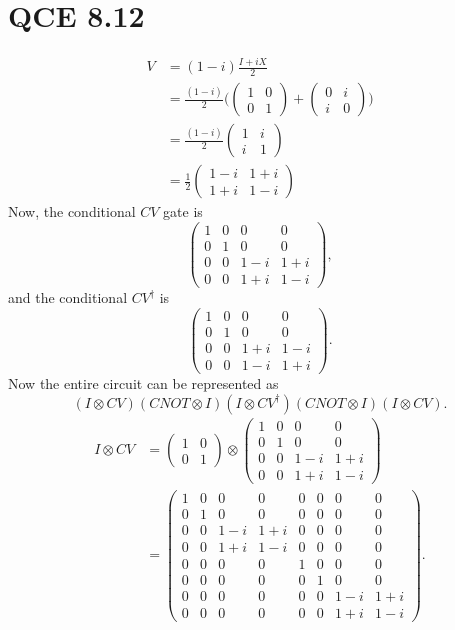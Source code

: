 \documentclass[10pt]{article}
\begin{document}
\section*{QCE 8.12}
\begin{align*}
V &= (1 - i) \frac{I + iX}{2} \\
   &= \frac{(1 - i)}{2} 
\Bigg( 
\begin{pmatrix}
 1 & 0 \\
 0 & 1  
\end{pmatrix}    
+
\begin{pmatrix}
0 & i \\
i & 0
\end{pmatrix}
\Bigg) \\
&= 
\frac{(1-i)}{2} 
\begin{pmatrix}
1 & i \\
i & 1
\end{pmatrix} \\
&= 
\frac{1}{2}
\begin{pmatrix}
1 - i & 1 + i \\
1 + i & 1 - i
\end{pmatrix}
\end{align*}
Now, the conditional $CV$ gate is 
\[
\begin{pmatrix}
1 & 0 & 0 & 0 \\
0 & 1 & 0 & 0 \\
0 & 0 & 1 - i & 1 + i \\
0 & 0 & 1 + i & 1 - i 
\end{pmatrix},
\]
and the conditional $CV^{\dag}$ is
\[
\begin{pmatrix}
1 & 0 & 0 & 0 \\
0 & 1 & 0 & 0 \\
0 & 0 & 1 + i & 1 - i \\
0 & 0 & 1 - i & 1 + i 
\end{pmatrix}.
\]
Now the entire circuit can be represented as
\[
(I \otimes CV)(CNOT \otimes I)(I \otimes CV^{\dag})(CNOT \otimes I)(I \otimes CV).
\]
\begin{align*}
I \otimes CV &= 
\begin{pmatrix}
1 & 0 \\
0 & 1
\end{pmatrix}
\otimes 
\begin{pmatrix}
1 & 0 & 0 & 0 \\
0 & 1 & 0 & 0 \\
0 & 0 & 1 - i & 1 + i \\
0 & 0 & 1 + i & 1 - i 
\end{pmatrix} \\
&= 
\begin{pmatrix}
1 & 0 & 0 & 0 & 0 & 0 & 0 & 0 \\
0 & 1 & 0 & 0 & 0 & 0 & 0 & 0 \\
0 & 0 & 1 - i & 1 + i & 0 & 0 & 0 & 0 \\
0 & 0 & 1 + i & 1 - i & 0 & 0 & 0 & 0 \\
\hline
0 & 0 & 0 & 0 & 1 & 0 & 0 & 0 \\
0 & 0 & 0 & 0 & 0 & 1 & 0 & 0 \\
0 & 0 & 0 & 0 & 0 & 0 & 1-i & 1+i \\
0 & 0 & 0 & 0 & 0 & 0 & 1+i & 1-i
\end{pmatrix}.
\end{align*}
\end{document}

